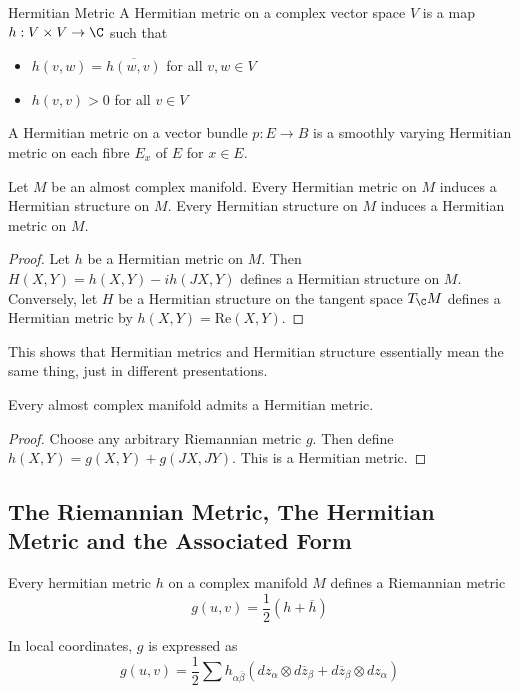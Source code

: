 \documentclass[a4paper]{article}
\begin{document}
\begin{defn}{Hermitian Metric}{} A Hermitian metric on a complex vector space $V$ is a map $h:V\times V\to\C$ such that 
\begin{itemize}
\item $h(v,w)=\overline{h(w,v)}$ for all $v,w\in V$
\item $h(v,v)>0$ for all $v\in V$
\end{itemize}
A Hermitian metric on a vector bundle $p:E\to B$ is a smoothly varying Hermitian metric on each fibre $E_x$ of $E$ for $x\in E$. 
\end{defn}

\begin{prp}{}{} Let $M$ be an almost complex manifold. Every Hermitian metric on $M$ induces a Hermitian structure on $M$. Every Hermitian structure on $M$ induces a Hermitian metric on $M$. \tcbline
\begin{proof}
Let $h$ be a Hermitian metric on $M$. Then $H(X,Y)=h(X,Y)-ih(JX,Y)$ defines a Hermitian structure on $M$. Conversely, let $H$ be a Hermitian structure on the tangent space $T_\C M$ defines a Hermitian metric by $h(X,Y)=\text{Re}(X,Y)$. 
\end{proof}
\end{prp}

This shows that Hermitian metrics and Hermitian structure essentially mean the same thing, just in different presentations. 

\begin{prp}{}{} Every almost complex manifold admits a Hermitian metric. \tcbline
\begin{proof}
Choose any arbitrary Riemannian metric $g$. Then define $h(X,Y)=g(X,Y)+g(JX,JY)$. This is a Hermitian metric. 
\end{proof}
\end{prp}

\subsection{The Riemannian Metric, The Hermitian Metric and the Associated Form}
\begin{prp}{}{} Every hermitian metric $h$ on a complex manifold $M$ defines a Riemannian metric $$g(u,v)=\frac{1}{2}(h+\overline{h})$$
\end{prp}

In local coordinates, $g$ is expressed as $$g(u,v)=\frac{1}{2}\sum h_{\alpha\overline{\beta}}(dz_\alpha\otimes d\overline{z}_\beta+d\overline{z}_\beta\otimes dz_\alpha)$$
\end{document}
